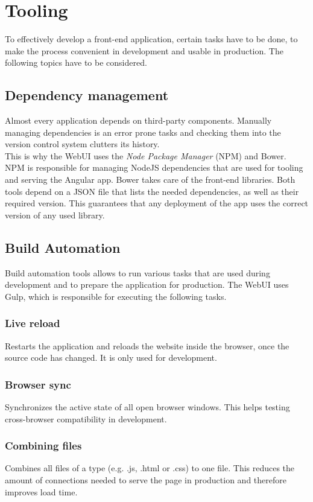 \section{Tooling}
To effectively develop a front-end application, certain tasks have to be done, to make the process convenient in development and usable in production. The following topics have to be considered.


\subsection{Dependency management}
Almost every application depends on third-party components. Manually managing dependencies is an error prone tasks and checking them into the version control system clutters its history.\\
This is why the WebUI uses the \textit{Node Package Manager} (NPM) and Bower. NPM is responsible for managing NodeJS dependencies that are used for tooling and serving the Angular app. Bower takes care of the front-end libraries. Both tools depend on a JSON file that lists the needed dependencies, as well as their required version. This guarantees that any deployment of the app uses the correct version of any used library.


\subsection{Build Automation}
Build automation tools allows to run various tasks that are used during development and to prepare the application for production. The WebUI uses Gulp, which is responsible for executing the following tasks.

\subsubsection{Live reload} Restarts the application and reloads the website inside the browser, once the source code has changed. It is only used for development.

\subsubsection{Browser sync} Synchronizes the active state of all open browser windows. This helps testing cross-browser compatibility in development.

\subsubsection{Combining files} Combines all files of a type (e.g. .js, .html or .css) to one file. This reduces the amount of connections needed to serve the page in production and therefore improves load time.

